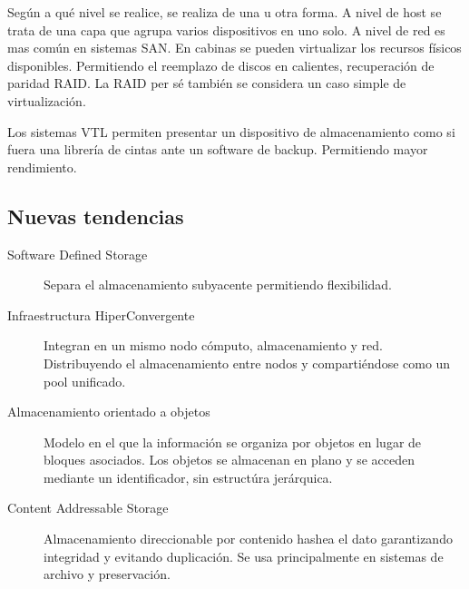     Según a qué nivel se realice, se realiza de una u otra forma. A nivel de host se trata de una capa que agrupa varios dispositivos en uno solo. A nivel de red es mas común en sistemas SAN. En cabinas se pueden virtualizar los recursos físicos disponibles. Permitiendo el reemplazo de discos en calientes, recuperación de paridad RAID. La RAID per sé también se considera un caso simple de virtualización.

    Los sistemas VTL permiten presentar un dispositivo de almacenamiento como si fuera una librería de cintas ante un software de backup. Permitiendo mayor rendimiento.

\subsection{Nuevas tendencias}

\begin{description}
    \item[Software Defined Storage] Separa el almacenamiento subyacente permitiendo flexibilidad.
    \item[Infraestructura HiperConvergente] Integran en un mismo nodo cómputo, almacenamiento y red. Distribuyendo el almacenamiento entre nodos y compartiéndose como un pool unificado.
    \item[Almacenamiento orientado a objetos] Modelo en el que la información se organiza por objetos en lugar de bloques asociados. Los objetos se almacenan en plano y se acceden mediante un identificador, sin estructúra jerárquica.
    \item[Content Addressable Storage] Almacenamiento direccionable por contenido hashea el dato garantizando integridad y evitando duplicación. Se usa principalmente en sistemas de archivo y preservación.
\end{description}